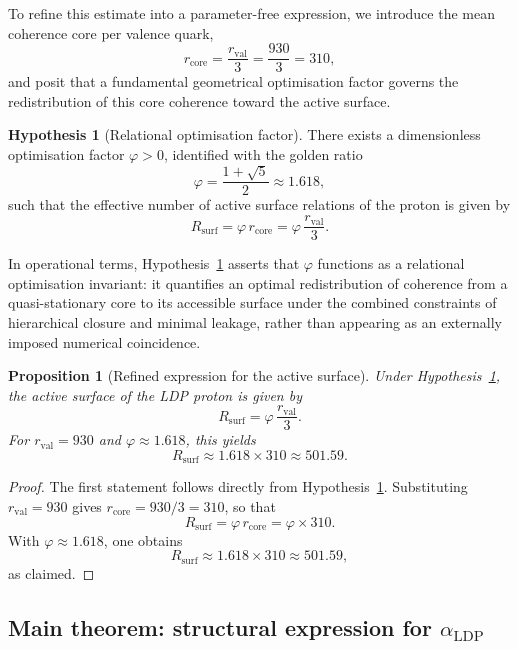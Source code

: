 \documentclass[11pt,a4paper]{article}
\theoremstyle{plain}
\newtheorem{proposition}{Proposition}
\theoremstyle{definition}
\newtheorem{hypothesis}{Hypothesis}
\theoremstyle{remark}
\begin{document}
To refine this estimate into a parameter-free expression, we introduce the mean coherence core per valence quark,
\[
  r_{\mathrm{core}} = \frac{r_{\mathrm{val}}}{3} = \frac{930}{3} = 310,
\]
and posit that a fundamental geometrical optimisation factor governs the redistribution of this core coherence toward the active surface.

\begin{hypothesis}[Relational optimisation factor]
  \label{hyp:phi}
  There exists a dimensionless optimisation factor \(\varphi > 0\), identified with the
  golden ratio
  \[
    \varphi = \frac{1 + \sqrt{5}}{2} \approx 1.618,
  \]
  such that the effective number of active surface relations of the proton is given by
  \[
    R_{\mathrm{surf}} = \varphi\, r_{\mathrm{core}}
    = \varphi\, \frac{r_{\mathrm{val}}}{3}.
  \]
\end{hypothesis}

In operational terms, Hypothesis~\ref{hyp:phi} asserts that \(\varphi\) functions as a relational optimisation invariant: it quantifies an optimal redistribution of coherence from a quasi-stationary core to its accessible surface under the combined constraints of hierarchical closure and minimal leakage, rather than appearing as an externally imposed numerical coincidence.

\begin{proposition}[Refined expression for the active surface]
  \label{prop:Rsurf_refined}
  Under Hypothesis~\ref{hyp:phi}, the active surface of the LDP proton is given by
  \[
    R_{\mathrm{surf}} = \varphi\, \frac{r_{\mathrm{val}}}{3}.
  \]
  For \(r_{\mathrm{val}} = 930\) and \(\varphi \approx 1.618\), this yields
  \[
    R_{\mathrm{surf}} \approx 1.618 \times 310 \approx 501.59.
  \]
\end{proposition}

\begin{proof}
  The first statement follows directly from Hypothesis~\ref{hyp:phi}. Substituting \(r_{\mathrm{val}} = 930\) gives \(r_{\mathrm{core}} = 930/3 = 310\),
  so that
  \[
    R_{\mathrm{surf}} = \varphi\, r_{\mathrm{core}}
    = \varphi \times 310.
  \]
  With \(\varphi \approx 1.618\), one obtains
  \[
    R_{\mathrm{surf}} \approx 1.618 \times 310 \approx 501.59,
  \]
  as claimed.
\end{proof}

\subsection{Main theorem: structural expression for \texorpdfstring{\(\alpha_{\mathrm{LDP}}\)}{alpha\_LDP}}
\end{document}
